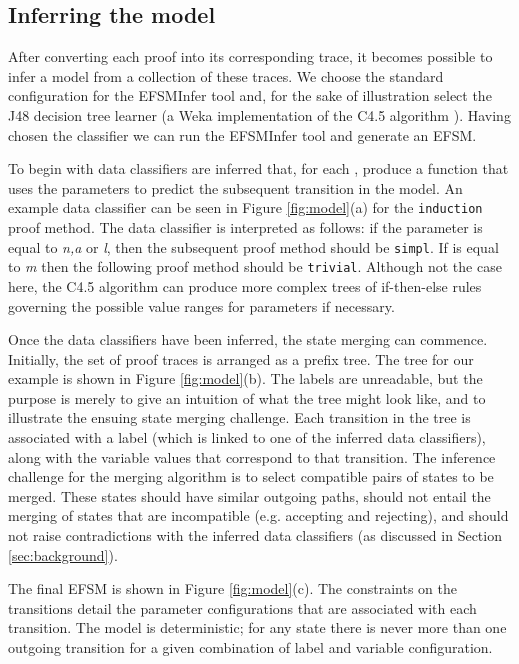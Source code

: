 \documentclass{llncs}
\begin{document}
\subsection{Inferring the model}
After converting each proof into its corresponding trace, it becomes possible to infer a model from a collection of these traces. We choose the standard configuration for the EFSMInfer tool and, for the sake of illustration select the J48 decision tree learner (a Weka implementation of the C4.5 algorithm \cite{Quinlan93}). Having chosen the classifier we can run the EFSMInfer tool and generate an EFSM.

To begin with data classifiers are inferred that, for each , produce a function that uses the parameters to predict the subsequent transition in the model. An example data classifier can be seen in Figure \ref{fig:model}(a) for the {\tt induction} proof method. The data classifier is interpreted as follows: if the parameter  is equal to \emph{n,a} or \emph{l}, then the subsequent proof method should be {\tt simpl}. If  is equal to \emph{m} then the following proof method should be {\tt trivial}. Although not the case here, the C4.5 algorithm can produce more complex trees of if-then-else rules governing the possible value ranges for parameters if necessary.

Once the data classifiers have been inferred, the state merging can commence. Initially, the set of proof traces is arranged as a prefix tree. The tree for our example is shown in Figure \ref{fig:model}(b). The labels are unreadable, but the purpose is merely to give an intuition of what the tree might look like, and to illustrate the ensuing state merging challenge. Each transition in the tree is associated with a label (which is linked to one of the inferred data classifiers), along with the variable values that correspond to that transition. The inference challenge for the merging algorithm is to select compatible pairs of states to be merged. These states should have similar outgoing paths, should not entail the merging of states that are incompatible (e.g. accepting and rejecting), and should not raise contradictions with the inferred data classifiers (as discussed in Section \ref{sec:background}).

The final EFSM is shown in Figure \ref{fig:model}(c). The constraints on the transitions detail the parameter configurations that are associated with each transition. The model is deterministic; for any state there is never more than one outgoing transition for a given combination of label and variable configuration.
\end{document}
